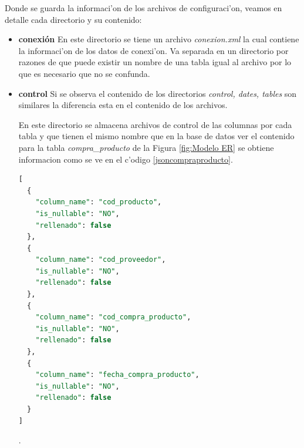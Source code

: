 Donde se guarda la informaci'on de los archivos de configuraci'on, veamos en detalle cada directorio y su contenido:
\begin{itemize}
\item \textbf{conexi\'on} En este directorio se tiene un archivo \textit{conexion.xml} la cual contiene la informaci'on de los datos de conexi'on. Va separada en un directorio por razones de que puede existir un nombre de una tabla igual al archivo por lo que es necesario que no se confunda.
\item \textbf{control} Si se observa el contenido de los directorios \textit{control, dates, tables} son similares la diferencia esta en el contenido de los archivos.
 
En este directorio se almacena archivos de control de las columnas por cada tabla y que tienen el mismo nombre que en la base de datos ver el contenido para la tabla \textit{compra\_producto} de la Figura \ref{fig:Modelo ER} se obtiene informacion como se ve en el c'odigo \ref{jsoncompraproducto}.

\begin{lstlisting}[caption={Ejemplo archivo control},label={jsoncompraproducto},language=sql]
[
  {
    "column_name": "cod_producto",
    "is_nullable": "NO",
    "rellenado": false
  },
  {
    "column_name": "cod_proveedor",
    "is_nullable": "NO",
    "rellenado": false
  },
  {
    "column_name": "cod_compra_producto",
    "is_nullable": "NO",
    "rellenado": false
  },
  {
    "column_name": "fecha_compra_producto",
    "is_nullable": "NO",
    "rellenado": false
  }
]
\end{lstlisting}.
 

\end{itemize}
